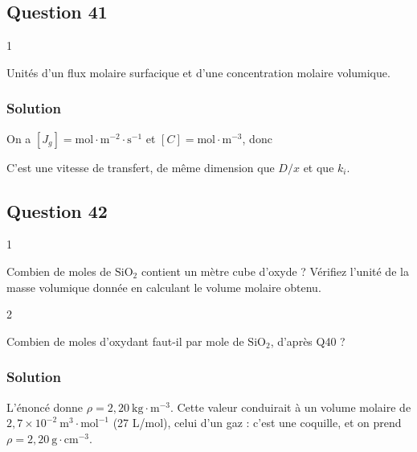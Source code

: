 \documentclass[11pt,a4paper]{article}
\newcommand{\equationajustee}[1]{%
  \sbox{\boiteequation}{$\displaystyle #1$}%
  \ifdim\wd\boiteequation>\linewidth
    \[\resizebox{\linewidth}{!}{\usebox{\boiteequation}}\]%
  \else
    \[#1\]%
  \fi}
\begin{document}
\hypertarget{question-41}{%
\subsection{Question 41}\label{question-41}}

\begin{indication}{1}

Unités d'un flux molaire surfacique et d'une concentration molaire volumique.

\end{indication}

\hypertarget{solution-40}{%
\subsubsection{Solution}\label{solution-40}}

On a \([J_g]=\mathrm{mol\cdot m^{-2}\cdot s^{-1}}\) et \([C]=\mathrm{mol\cdot m^{-3}}\), donc

\equationajustee{\boxed{[h_g]=\mathrm{m\cdot s^{-1}}}}

C'est une vitesse de transfert, de même dimension que \(D/x\) et que \(k_i\).

\hypertarget{question-42}{%
\subsection{Question 42}\label{question-42}}

\begin{indication}{1}

Combien de moles de \(\mathrm{SiO_2}\) contient un mètre cube d'oxyde ? Vérifiez l'unité de la masse volumique donnée en calculant le volume molaire obtenu.

\end{indication}

\begin{indication}{2}

Combien de moles d'oxydant faut-il par mole de \(\mathrm{SiO_2}\), d'après Q40 ?

\end{indication}

\hypertarget{solution-41}{%
\subsubsection{Solution}\label{solution-41}}

L'énoncé donne \(\rho=2{,}20\ \mathrm{kg\cdot m^{-3}}\). Cette valeur conduirait à un volume molaire de \(2{,}7\times10^{-2}\ \mathrm{m^3\cdot mol^{-1}}\) (27 L/mol), celui d'un gaz : c'est une coquille, et on prend \(\rho=2{,}20\ \mathrm{g\cdot cm^{-3}}\).
\end{document}
